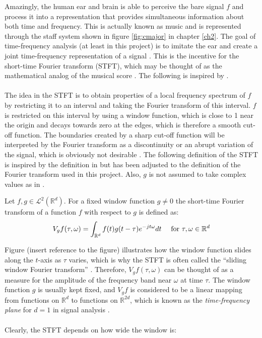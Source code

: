 Amazingly, the human ear and brain is able to perceive the bare signal $f$ and process it into a representation that provides simultaneous information about both time and frequency. This is actually known as music and is represented through the staff system shown in figure \ref{fig:cmajor} in chapter \ref{ch2}. The goal of time-frequency analysis (at least in this project) is to imitate the ear and create a joint time-frequency representation of a signal \cite{page 22, FTFA}. This is the incentive for the short-time Fourier transform (STFT), which may be thought of as the mathematical analog of the musical score \cite{page 37, FTFA}. The following is inspired by \cite{page 37, FTFA}.
\\ \\
The idea in the STFT is to obtain properties of a local frequency spectrum of $f$ by restricting it to an interval and taking the Fourier transform of this interval. $f$ is restricted on this interval by using a window function, which is close to 1 near the origin and decays towards zero at the edges, which is therefore a smooth cut-off function. The boundaries created by a sharp cut-off function will be interpreted by the Fourier transform as a discontinuity or an abrupt variation of the signal, which is obviously not desirable \cite{Davis}. The following definition of the STFT is inspired by the definition in \cite{page 37, FTFA} but has been adjusted to the definition of the Fourier transform used in this project. Also, $g$ is not assumed to take complex values as in \cite{page 37, FTFA}.

\begin{definition}
Let $f,g \in \mathcal{L}^2(\mathbb{R}^d)$. For a fixed window function $g \neq 0$ the short-time Fourier transform of a function $f$ with respect to $g$ is defined as:
\begin{align}
V_gf(\tau,\omega) = \int_{\mathbb{R}^d} f(t) g(t - \tau) e^{-j t \omega} dt \quad \textnormal{ for } \tau,\omega \in \mathbb{R}^d
\end{align}
\end{definition}

Figure (insert reference to the figure) illustrates how the window function slides along the $t$-axis as $\tau$ varies, which is why the STFT is often called the ``sliding window Fourier transform'' . Therefore, $V_gf(\tau,\omega)$ can be thought of as a measure for the amplitude of the frequency band near $\omega$ at time $\tau$. The window function $g$ is usually kept fixed, and $V_gf$ is considered to be a linear mapping from functions on $\mathbb{R}^d$ to functions on $\mathbb{R}^{2d}$, which is known as the \textit{time-frequency plane} for $d=1$ in signal analysis \cite{page 38, FTFA}.
\\ \\
Clearly, the STFT depends on how wide the window is:
